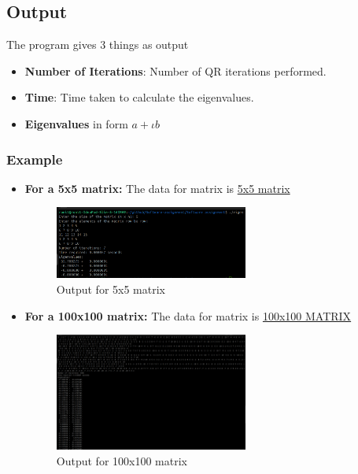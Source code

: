 \documentclass[12pt,oneside,letterpaper,english]{article}
\begin{document}
\subsection{Output}
The program gives 3 things as output
\begin{itemize}
    \item \textbf{Number of Iterations}: Number of QR iterations performed.
    \item \textbf{Time}: Time taken to calculate the eigenvalues.
    \item \textbf{Eigenvalues} in form $a + \iota b$
\end{itemize}

\subsubsection{Example}
\begin{itemize}
    \item \textbf{For a 5x5 matrix:} 
    The data for matrix is \href{https://github.com/igiamronit/Software-assignment/blob/main/Report/Data/matrices/5x5.txt}{5x5 matrix}
    \begin{figure}[h!]
    \centering
    \includegraphics[width=0.6\textwidth]{Data/Images/5x5.png} 
    \caption{Output for 5x5 matrix}
    \end{figure}

    \item \textbf{For a 100x100 matrix: }
    The data for matrix is \href{https://github.com/igiamronit/Software-assignment/blob/main/Report/Data/matrices/100x100.txt}{100x100 MATRIX}
    \begin{figure}[h!]
    \centering
    \includegraphics[width=0.6\textwidth]{Data/Images/100x100.png} 
    \caption{Output for 100x100 matrix}
    \end{figure}    
\end{itemize}
\end{document}
